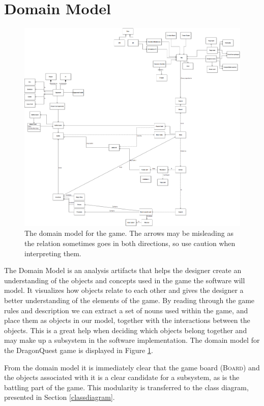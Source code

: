 \section{Domain Model}
\label{sec:domainmodel}

\begin{figure}[h]
\center
\includegraphics{diagrams/DomainModel.png}
\caption{The domain model for the game. The arrows may be misleading as the relation sometimes goes in both directions, so use caution when interpreting them.}
\label{fig:domain_model}
\end{figure}

The Domain Model is an analysis artifacts that helps the designer create an understanding of the objects and concepts used in the game the software will model. It visualizes how objects relate to each other and gives the designer a better understanding of the elements of the game. By reading through the game rules and description we can extract a set of nouns used within the game, and place them as objects in our model, together with the interactions between the objects. This is a great help when deciding which objects belong together and may make up a subsystem in the software implementation. The domain model for the DragonQuest game is displayed in Figure \ref{fig:domain_model}.

From the domain model it is immediately clear that the game board (\textsc{Board}) and the objects associated with it is a clear candidate for a subsystem, as is the battling part of the game. This modularity is transferred to the class diagram, presented in Section \ref{classdiagram}.

